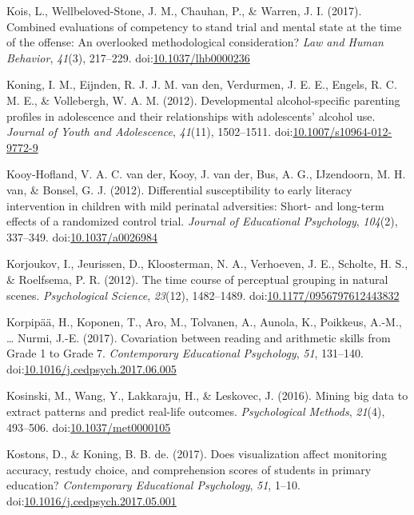 \documentclass[english,man]{apa6}
\theoremstyle{definition}
\theoremstyle{definition}
\theoremstyle{definition}
\theoremstyle{remark}
\begin{document}
\hypertarget{ref-Kois2017}{}
Kois, L., Wellbeloved-Stone, J. M., Chauhan, P., \& Warren, J. I.
(2017). Combined evaluations of competency to stand trial and mental
state at the time of the offense: An overlooked methodological
consideration? \emph{Law and Human Behavior}, \emph{41}(3), 217--229.
doi:\href{https://doi.org/10.1037/lhb0000236}{10.1037/lhb0000236}

\hypertarget{ref-Koning2012}{}
Koning, I. M., Eijnden, R. J. J. M. van den, Verdurmen, J. E. E.,
Engels, R. C. M. E., \& Vollebergh, W. A. M. (2012). Developmental
alcohol-specific parenting profiles in adolescence and their
relationships with adolescents' alcohol use. \emph{Journal of Youth and
Adolescence}, \emph{41}(11), 1502--1511.
doi:\href{https://doi.org/10.1007/s10964-012-9772-9}{10.1007/s10964-012-9772-9}

\hypertarget{ref-VanderKooy-Hofland2012}{}
Kooy-Hofland, V. A. C. van der, Kooy, J. van der, Bus, A. G.,
IJzendoorn, M. H. van, \& Bonsel, G. J. (2012). Differential
susceptibility to early literacy intervention in children with mild
perinatal adversities: Short- and long-term effects of a randomized
control trial. \emph{Journal of Educational Psychology}, \emph{104}(2),
337--349. doi:\href{https://doi.org/10.1037/a0026984}{10.1037/a0026984}

\hypertarget{ref-Korjoukov2012}{}
Korjoukov, I., Jeurissen, D., Kloosterman, N. A., Verhoeven, J. E.,
Scholte, H. S., \& Roelfsema, P. R. (2012). The time course of
perceptual grouping in natural scenes. \emph{Psychological Science},
\emph{23}(12), 1482--1489.
doi:\href{https://doi.org/10.1177/0956797612443832}{10.1177/0956797612443832}

\hypertarget{ref-Korpipaa2017}{}
Korpipää, H., Koponen, T., Aro, M., Tolvanen, A., Aunola, K., Poikkeus,
A.-M., \ldots{} Nurmi, J.-E. (2017). Covariation between reading and
arithmetic skills from Grade 1 to Grade 7. \emph{Contemporary
Educational Psychology}, \emph{51}, 131--140.
doi:\href{https://doi.org/10.1016/j.cedpsych.2017.06.005}{10.1016/j.cedpsych.2017.06.005}

\hypertarget{ref-Kosinski2013}{}
Kosinski, M., Wang, Y., Lakkaraju, H., \& Leskovec, J. (2016). Mining
big data to extract patterns and predict real-life outcomes.
\emph{Psychological Methods}, \emph{21}(4), 493--506.
doi:\href{https://doi.org/10.1037/met0000105}{10.1037/met0000105}

\hypertarget{ref-Kostons2017}{}
Kostons, D., \& Koning, B. B. de. (2017). Does visualization affect
monitoring accuracy, restudy choice, and comprehension scores of
students in primary education? \emph{Contemporary Educational
Psychology}, \emph{51}, 1--10.
doi:\href{https://doi.org/10.1016/j.cedpsych.2017.05.001}{10.1016/j.cedpsych.2017.05.001}
\end{document}
